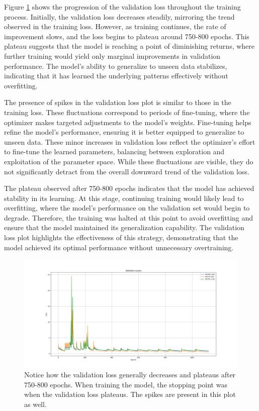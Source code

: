 \documentclass[conference]{IEEEtran}
\begin{document}
Figure \ref{fig:fig2} shows the progression of the validation loss throughout the training process. 
Initially, 
the validation loss decreases steadily, 
mirroring the trend observed in the training loss. 
However, 
as training continues, 
the rate of improvement slows, 
and the loss begins to plateau around 750-800 epochs. 
This plateau suggests that the model is reaching a point of diminishing returns, 
where further training would yield only marginal improvements in validation performance. 
The model’s ability to generalize to unseen data stabilizes, 
indicating that it has learned the underlying patterns effectively without overfitting.

The presence of spikes in the validation loss plot is similar to those in the training loss. 
These fluctuations correspond to periods of fine-tuning, 
where the optimizer makes targeted adjustments to the model’s weights. 
Fine-tuning helps refine the model's performance, 
ensuring it is better equipped to generalize to unseen data. 
These minor increases in validation loss reflect the optimizer's effort to fine-tune the learned parameters, 
balancing between exploration and exploitation of the parameter space. 
While these fluctuations are visible, 
they do not significantly detract from the overall downward trend of the validation loss.

The plateau observed after 750-800 epochs indicates that the model has achieved stability in its learning. 
At this stage, 
continuing training would likely lead to overfitting, 
where the model’s performance on the validation set would begin to degrade. 
Therefore, 
the training was halted at this point to avoid overfitting and ensure that the model maintained its generalization capability. 
The validation loss plot highlights the effectiveness of this strategy, 
demonstrating that the model achieved its optimal performance without unnecessary overtraining.



\begin{figure}[h]
    \centering
    \includegraphics[scale=0.2]{Figure_2.png}
    \caption{
        Notice how the validation loss generally decreases and plateaus after 750-800 epochs. 
        When training the model, 
        the stopping point was when the validation loss plateaus. 
        The spikes are present in this plot as well.    
    }
    \label{fig:fig2}
\end{figure}
\end{document}
